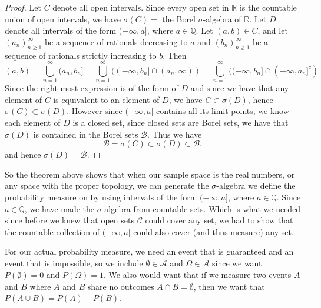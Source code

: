 \documentclass[../main.tex]{subfiles}
\begin{document}
\begin{proof}
Let $C$ denote all open intervals. Since every open set in $ \mathbb{R} $ is the countable union of open intervals, we have $ \sigma(C) =  $ the Borel $ \sigma$-algebra of $\mathbb{R}$. Let $D$ denote all intervals of the form $(-\infty, a]$, where $ a \in \mathbb{Q}$. Let $ (a,b) \in C$, and let $ (a_n)^\infty_{n \geq 1} $ be a sequence of rationals decreasing to $a$ and $(b_n)^\infty_{n\geq1}$ be a sequence of rationals strictly increasing to $b$. Then
\[
(a,b) = \bigcup^\infty_{n=1}{(a_n, b_n]} = \bigcup^\infty_{n=1}{((-\infty, b_n] \cap (a_n, \infty))} = 
\bigcup^\infty_{n=1}{((-\infty, b_n] \cap (-\infty, a_n]^c)}
\]
Since the right most expression is of the form of $D$ and since we have that any element of $C$ is equivalent to an element of $D$, we have $ C \subset \sigma(D) $, hence $ \sigma(C) \subset \sigma(D) $. However since $ (-\infty, a]$ contains all its limit points, we know each element of $D$ is a closed set, since closed sets are Borel sets, we have that $\sigma(D)$ is contained in the Borel sets $ \mathcal{B}$. Thus we have
\[
\mathcal{B} = \sigma(C) \subset \sigma(D) \subset \mathcal{B},
\]
and hence $ \sigma(D) = \mathcal{B}.$
\end{proof}

\begin{remark}
So the theorem above shows that when our sample space is the real numbers, or any space with the proper topology, we can generate the $\sigma$-algebra we define the probability measure on by using intervals of the form $(-\infty, a]$, where $ a \in \mathbb{Q}$. Since $ a \in \mathbb{Q}$, we have made the $\sigma$-algebra from countable sets. Which is what we needed since before we knew that open sets $ \mathcal{C}$ could cover any set, we had to show that the countable collection of $(-\infty, a]$ could also cover (and thus measure) any set.
\end{remark}



\begin{remark}
For our actual probability measure, we need an event that is guaranteed and an event that is impossible, so we include $ \emptyset \in \mathcal{A} $ and $ \Omega \in \mathcal{A} $ since we want $ P(\emptyset) = 0 $ and $ P(\Omega) = 1 $. We also would want that if we measure two events $ A$ and $B$ where $A$ and $B$ share no outcomes $A \cap B = \emptyset$, then we want that $ P(A \cup B) = P(A) + P(B) $.
\end{remark}
\end{document}
